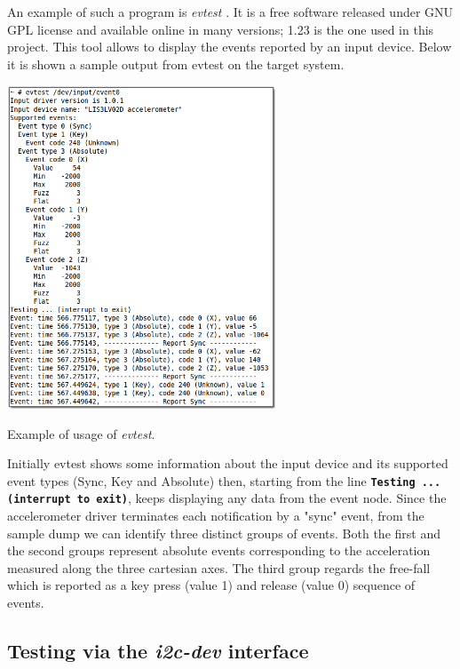 \documentclass[a4paper,10pt]{article}
\makeatletter
\newenvironment{figurehere}{\def\@captype{figure}\vspace{2ex}}{\vspace{2ex}}
\newcommand{\keyword}[1]{\texttt{\textbf{#1}}}
\makeatother
\begin{document}
\begin{multicols}{2}
An example of such a program is \emph{evtest} \cite{evtest}. It is a free
software released under GNU GPL license and available online in many versions;
1.23 is the one used in this project. This tool allows to display the events
reported by an input device. Below it is shown a sample output from evtest on
the target system.

\begin{figurehere}
 \centering
 \includegraphics[width=8cm]{./figures/dump-evtest.png}
 \caption{Example of usage of \emph{evtest}.}
 \label{fig:evtest-dump}
\end{figurehere}

Initially evtest shows some information about the input device and its supported
event types (Sync, Key and Absolute) then, starting from the line
\keyword{Testing ... (interrupt to exit)}, keeps displaying any data from the
event node.
Since the accelerometer driver terminates each notification by a "sync" event, 
from the sample dump we can identify three distinct groups of events.
Both the first and the second groups represent absolute events corresponding to
the acceleration measured along the three cartesian axes.
The third group regards the free-fall which is reported as a key press
(value 1) and release (value 0) sequence of events.



\subsection{Testing via the \emph{i2c-dev} interface}
\label{sec:i2c-dev-testing}


\end{multicols}
\end{document}

